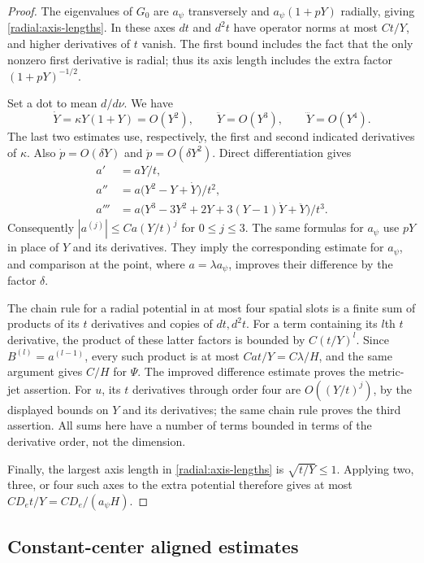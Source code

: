 \begin{proof}
The eigenvalues of $G_0$ are $a_\psi$ transversely and $a_\psi(1+pY)$ radially, giving \eqref{radial:axis-lengths}. In these axes $dt$ and $d^2t$ have operator norms at most $Ct/Y$, and higher derivatives of $t$ vanish. The first bound includes the fact that the only nonzero first derivative is radial; thus its axis length includes the extra factor $(1+pY)^{-1/2}$.

Set a dot to mean $d/d\nu$. We have
\[
 \dot Y=\kappa Y(1+Y)=O(Y^2),\qquad
 \ddot Y=O(Y^3),\qquad \dddot Y=O(Y^4).
\]
The last two estimates use, respectively, the first and second indicated derivatives of $\kappa$. Also $\dot p=O(\delta Y)$ and $\ddot p=O(\delta Y^2)$. Direct differentiation gives
\begin{align*}
 a'&=aY/t,\\
 a''&=a\bigl(Y^2-Y+\dot Y\bigr)/t^2,\\
 a'''&=a\bigl(Y^3-3Y^2+2Y+3(Y-1)\dot Y+\ddot Y\bigr)/t^3.
\end{align*}
Consequently $|a^{(j)}|\le Ca(Y/t)^j$ for $0\le j\le3$. The same formulas for $a_\psi$ use $pY$ in place of $Y$ and its derivatives. They imply the corresponding estimate for $a_\psi$, and comparison at the point, where $a=\lambda a_\psi$, improves their difference by the factor $\delta$.

The chain rule for a radial potential in at most four spatial slots is a finite sum of products of its $t$ derivatives and copies of $dt,d^2t$. For a term containing its $l$th $t$ derivative, the product of these latter factors is bounded by $C(t/Y)^l$. Since $B^{(l)}=a^{(l-1)}$, every such product is at most $Cat/Y=C\lambda/H$, and the same argument gives $C/H$ for $\Psi$. The improved difference estimate proves the metric-jet assertion. For $u$, its $t$ derivatives through order four are $O((Y/t)^j)$, by the displayed bounds on $Y$ and its derivatives; the same chain rule proves the third assertion. All sums here have a number of terms bounded in terms of the derivative order, not the dimension.

Finally, the largest axis length in \eqref{radial:axis-lengths} is $\sqrt{t/Y}\le1$. Applying two, three, or four such axes to the extra potential therefore gives at most $CD_e t/Y=CD_e/(a_\psi H)$.
\end{proof}

\subsection{Constant-center aligned estimates}

